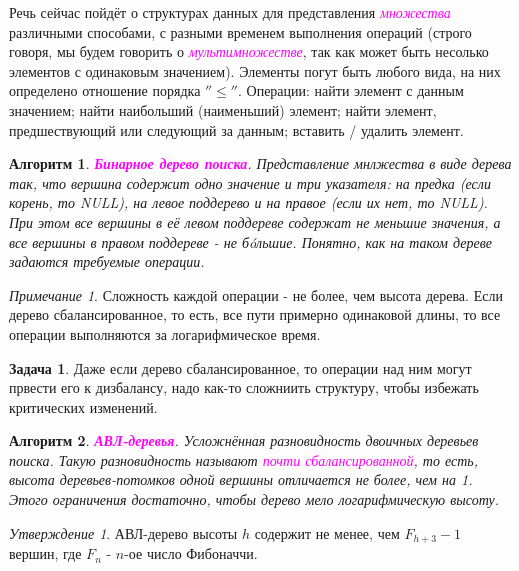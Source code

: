 \documentclass[a4paper]{article}
\theoremstyle{indented}
\newtheorem{alg}{Алгоритм}
\theoremstyle{definition}
\newtheorem{prob}{Задача}
\theoremstyle{remark}
\newtheorem{remark}{Примечание}
\newtheorem{stat}{Утверждение}
\begin{document}
Речь сейчас пойдёт о структурах данных для представления \textcolor{magenta}{\hypertarget{d13}{\textit{множества}}} различными способами, с разными временем выполнения операций (строго говоря, мы будем говорить о \textcolor{magenta}{\hypertarget{d14}{\textit{мультимножестве}}}, так как может быть несолько элементов с одинаковым значением). Элементы погут быть любого вида, на них определено отношение порядка $''\leq''$. Операции: найти элемент с данным значением; найти наибольший (наименьший) элемент; найти элемент, предшествующий или следующий за данным; вставить / удалить элемент. \\

\begin{alg}
    \textcolor{magenta}{\hypertarget{t27}{\textbf{Бинарное дерево поиска}}}. Представление мнлжества в виде дерева так, что вершина содержит одно значение и три указателя: на предка (если корень, то NULL), на левое поддерево и на правое (если их нет, то NULL). При этом все вершины в её левом поддереве содержат не меньшие значения, а все вершины в правом поддереве - не бóльшие. Понятно, как на таком дереве задаются требуемые операции.
\end{alg}

\begin{remark}
    Сложность каждой операции - не более, чем высота дерева. Если дерево сбалансированное, то есть, все пути примерно одинаковой длины, то все операции выполняются за логарифмическое время.
\end{remark}

\begin{prob}
    Даже если дерево сбалансированное, то операции над ним могут првести его к дизбалансу, надо как-то сложниить структуру, чтобы избежать критических изменений.
\end{prob}

\begin{alg}
    \textcolor{magenta}{\hypertarget{t28}{\textbf{АВЛ-деревья}}}. Усложнённая разновидность двоичных деревьев поиска. Такую разновидность называют \textcolor{magenta}{\hypertarget{d15}{\textit{почти сбалансированной}}}, то есть, высота деревьев-потомков одной вершины отличается не более, чем на 1. Этого ограничения достаточно, чтобы дерево мело логарифмическую высоту.
\end{alg}

\begin{stat}
    АВЛ-дерево высоты $h$ содержит не менее, чем $F_{h+3}-1$ вершин, где $F_n$ - $n$-ое число Фибоначчи.
\end{stat}
\end{document}

